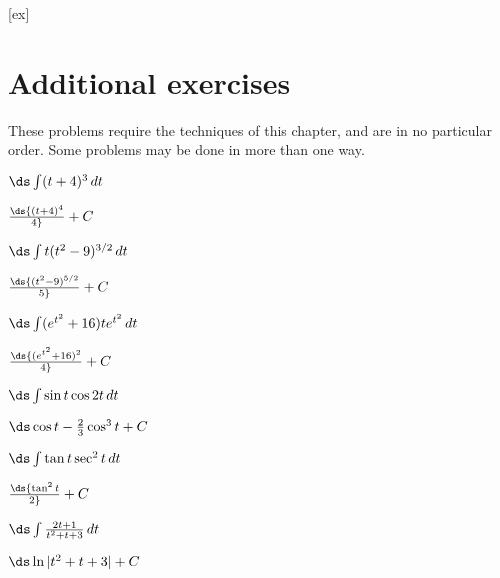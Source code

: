 [ex]
\section{Additional exercises}{}{}

\begin{enumialphparenastyle}

These problems require the techniques of this chapter, and are in no
particular order. Some problems may be done in more than one way.

\begin{ex}	%
 $\ds\int (t+4)^3\,dt$
\begin{sol}
 $\ds{(t+4)^4\over4}+C$
\end{sol}
\end{ex}

\begin{ex}	%
 $\ds\int t(t^2-9)^{3/2}\,dt$
\begin{sol}
 $\ds{(t^2-9)^{5/2}\over5}+C$
\end{sol}
\end{ex}

\begin{ex}	%
 $\ds\int (e^{t^2}+16)te^{t^2}\,dt$
\begin{sol}
 $\ds{(e^{t^2}+16)^2\over 4}+C$
\end{sol}
\end{ex}

\begin{ex}	%
 $\ds\int \sin t\cos 2t\,dt$
\begin{sol}
 $\ds\cos t-{2\over3}\cos^3 t+C$
\end{sol}
\end{ex}

\begin{ex}	%
 $\ds\int \tan t\sec^2t\,dt$
\begin{sol}
 $\ds{\tan^2 t\over 2}+C$
\end{sol}
\end{ex}

\begin{ex}	%
 $\ds\int {2t+1\over t^2+t+3}\,dt$
\begin{sol}
 $\ds\ln|t^2+t+3|+C$
\end{sol}
\end{ex}


\end{enumialphparenastyle}
